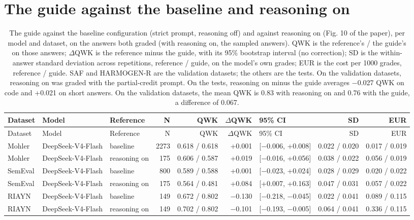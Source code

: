 \documentclass[10pt]{article}
\begin{document}
\section{The guide against the baseline and reasoning on}\label{sec:guiderefs}
\begingroup\footnotesize
\begin{longtable}{lllrrrlrr}
\caption{The guide against the baseline configuration (strict prompt, reasoning off) and against reasoning on (Fig. 10 of the paper), per model and dataset, on the answers both graded (with reasoning on, the sampled answers). QWK is the reference's / the guide's on those answers; $\Delta$QWK is the reference minus the guide, with its 95\% bootstrap interval (no correction); SD is the within-answer standard deviation across repetitions, reference / guide, on the model's own grades; EUR is the cost per 1000 grades, reference / guide. SAF and HARMOGEN-R are the validation datasets; the others are the tests. On the validation datasets, reasoning on was graded with the partial-credit prompt. On the tests, reasoning on minus the guide averages $-$0.027 QWK on code and +0.021 on short answers. On the validation datasets, the mean QWK is 0.83 with reasoning on and 0.76 with the guide, a difference of 0.067.}\\
\hline
Dataset & Model & Reference & N & QWK & $\Delta$QWK & 95\% CI & SD & EUR \\ \hline
\endfirsthead
\hline
Dataset & Model & Reference & N & QWK & $\Delta$QWK & 95\% CI & SD & EUR \\ \hline
\endhead
Mohler & DeepSeek-V4-Flash & baseline & 2273 & 0.618 / 0.618 & +0.001 & [$-$0.006, +0.008] & 0.022 / 0.020 & 0.017 / 0.019 \\
Mohler & DeepSeek-V4-Flash & reasoning on & 175 & 0.606 / 0.587 & +0.019 & [$-$0.016, +0.056] & 0.038 / 0.022 & 0.056 / 0.019 \\
SemEval & DeepSeek-V4-Flash & baseline & 800 & 0.589 / 0.588 & +0.001 & [$-$0.023, +0.024] & 0.028 / 0.029 & 0.020 / 0.022 \\
SemEval & DeepSeek-V4-Flash & reasoning on & 175 & 0.564 / 0.481 & +0.084 & [+0.007, +0.163] & 0.047 / 0.031 & 0.057 / 0.022 \\
RIAYN & DeepSeek-V4-Flash & baseline & 149 & 0.672 / 0.802 & $-$0.130 & [$-$0.218, $-$0.045] & 0.022 / 0.041 & 0.089 / 0.115 \\
RIAYN & DeepSeek-V4-Flash & reasoning on & 149 & 0.702 / 0.802 & $-$0.101 & [$-$0.193, $-$0.005] & 0.064 / 0.041 & 0.336 / 0.115 \\

\end{longtable}
\end{document}
